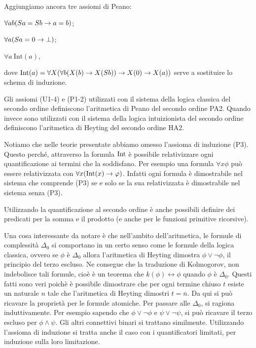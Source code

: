 \documentclass[]{marticle}
\begin{document}
Aggiungiamo ancora tre assiomi di Peano:
\begin{nlist}[P1]
    \item $\forall ab(Sa =Sb \rightarrow a = b)$;
    \item $\forall a(Sa=0 \rightarrow \bot)$;
    \item $\forall a\ \text{Int}(a)$,
\end{nlist}
dove $\text{Int}(a) = \forall X(\forall b (X(b)\rightarrow X(Sb)) \rightarrow X(0) \rightarrow X(a))$
serve a sostituire lo schema di induzione.

\begin{block}[Definizione]
    Gli assiomi (U1-4) e (P1-2) utilizzati con il sistema della logica classica
    del secondo ordine definiscono l'aritmetica di Peano del secondo ordine PA2.
    Quando invece sono utilizzati con il sistema della logica intuizionista del
    secondo ordine definiscono l'aritmetica di Heyting del secondo ordine HA2.
\end{block}

Notiamo che nelle teorie presentate abbiamo omesso l'assioma di induzione (P3).
Questo perch\'e, attraverso la formula $\text{Int}$ \`e possibile relativizzare ogni
quantificazione ai termini che la soddisfano. Per esempio una formula $\forall x
\phi$ pu\`o essere relativizzata con $\forall x (\text{Int}(x)\rightarrow \varphi)$. Infatti
ogni formula \`e dimostrabile nel sistema che comprende (P3) se e solo se la sua
relativizzata \`e dimostrabile nel sistema senza (P3).

Utilizzando la quantificazione al secondo ordine \`e anche possibili definire
dei predicati per la somma e il prodotto (e anche per le funzioni primitive
ricorsive).

Una cosa interessante da notare \`e che nell'ambito dell'aritmetica, le formule
di complessit\`a $\Delta_0$ si comportano in un certo senso come le formule
della logica classica, ovvero se $\phi$ \`e $\Delta_0$ allora l'aritmetica di
Heyting dimostra $\phi\lor \lnot \phi$, il principio del terzo escluso. Ne
consegue che la traduzione di Kolmogorov, non indebolisce tali formule, cio\`e
\`e un teorema che $k(\phi)\leftrightarrow \phi$ quando $\phi$ \`e $\Delta_0$.
Questi fatti sono veri poich\`e \`e possibile dimostrare che per ogni termine
chiuso $t$ esiste un naturale $n$ tale che l'aritmetica di Heyting dimostri
$t=\overline{n}$. Da qui si pu\`o ricavare la propriet\`a per le formule
atomiche. Per passare alle $\Delta_0$, si ragiona induttivamente. Per esempio
sapendo che $\phi\lor\lnot\phi$ e $\psi\lor\lnot\psi$, si pu\`o ricavare il
terzo escluso per $\phi\land\psi$. Gli altri connettivi binari si trattano
similmente. Utilizzando l'assioma di induzione si tratta anche il caso con i
quantificatori limitati, per induzione sulla loro limitazione. 
\end{document}

